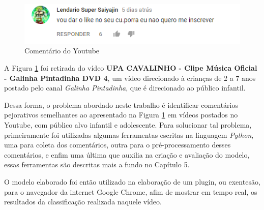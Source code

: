 \begin{figure}[H] %
	\caption{\label{fig:youtube_comment} Comentário do Youtube}
	\begin{center}
	    \includegraphics[scale=1]{figuras/figura_1.png} %
	\end{center}
\end{figure}

A Figura \ref{fig:youtube_comment} foi retirada do vídeo \textbf{UPA CAVALINHO - Clipe Música Oficial - Galinha Pintadinha DVD 4}, um vídeo direcionado à crianças de 2 a 7 anos postado pelo canal \emph{Galinha Pintadinha}, que é direcionado ao público infantil. %


Dessa forma, o problema abordado neste trabalho é identificar comentários pejorativos semelhantes ao apresentado na Figura \ref{fig:youtube_comment} em vídeos postados no Youtube, com público alvo infantil e adolescente. Para solucionar tal problema, primeiramente foi utilizadas algumas ferramentas escritas na linguagem \textit{Python}, uma para coleta dos comentários, outra para o pré-processamento desses comentários, e enfim uma última que auxilia na criação e avaliação do modelo, essas ferramentas são descritas mais a fundo no Capítulo 5. 

O modelo elaborado foi então utilizado na elaboração de um plugin, ou exentesão, para o navegador da internet Google Chrome, afim de mostrar em tempo real, os resultados da classificação realizada naquele vídeo.  %

